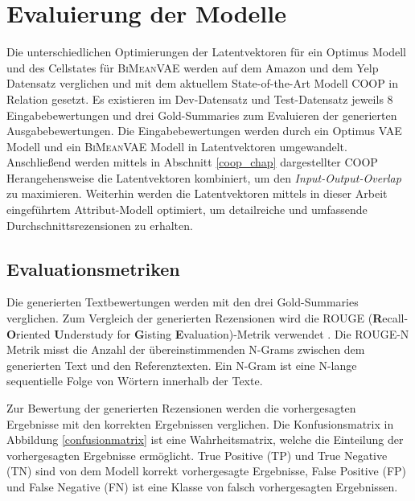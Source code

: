 \section{Evaluierung der Modelle}\raggedbottom
\label{evalmetric}
Die unterschiedlichen Optimierungen der Latentvektoren für ein Optimus Modell und des Cellstates für \textsc{BiMeanVAE} werden auf dem Amazon und dem Yelp Datensatz verglichen und mit dem aktuellem State-of-the-Art Modell COOP in Relation gesetzt.
Es existieren im Dev-Datensatz und Test-Datensatz jeweils 8 Eingabebewertungen und drei Gold-Summaries zum Evaluieren der generierten Ausgabebewertungen.
Die Eingabebewertungen werden durch ein Optimus VAE Modell und ein \textsc{BiMeanVAE} Modell in Latentvektoren umgewandelt.
Anschließend werden mittels in Abschnitt \ref{coop_chap} dargestellter COOP Herangehensweise die Latentvektoren kombiniert, um den \textit{Input-Output-Overlap} zu maximieren. 
Weiterhin werden die Latentvektoren mittels in dieser Arbeit eingeführtem Attribut-Modell optimiert, um detailreiche und umfassende Durchschnittsrezensionen zu erhalten.


\subsection{Evaluationsmetriken}
Die generierten Textbewertungen werden mit den drei Gold-Summaries verglichen.
Zum Vergleich der generierten Rezensionen wird die ROUGE (\textbf{R}ecall-\textbf{O}riented \textbf{U}nderstudy for \textbf{G}isting \textbf{E}valuation)-Metrik verwendet \citep{lin-2004-rouge}.
Die ROUGE-N Metrik misst die Anzahl der übereinstimmenden N-Grams zwischen dem generierten Text und den Referenztexten. 
Ein N-Gram ist eine N-lange sequentielle Folge von Wörtern innerhalb der Texte. 

Zur Bewertung der generierten Rezensionen werden die vorhergesagten Ergebnisse mit den korrekten Ergebnissen verglichen. 
Die Konfusionsmatrix in Abbildung \ref{confusionmatrix} ist eine Wahrheitsmatrix, welche die Einteilung der vorhergesagten Ergebnisse ermöglicht. 
True Positive (TP) und True Negative (TN) sind von dem Modell korrekt vorhergesagte Ergebnisse, False Positive (FP) und False Negative (FN) ist eine Klasse von falsch vorhergesagten Ergebnissen.



